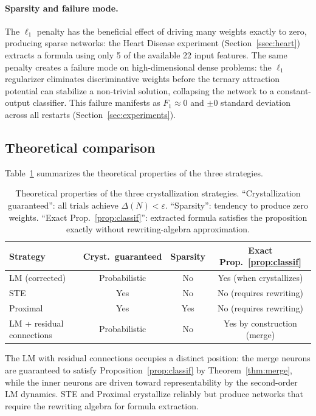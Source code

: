 \documentclass[12pt,a4paper]{article}
\begin{document}
\paragraph{Sparsity and failure mode.}
The $\ell_1$ penalty has the beneficial effect of driving many weights exactly
to zero, producing sparse networks: the Heart Disease experiment (Section~\ref{ssec:heart})
extracts a formula using only 5 of the available 22 input features.
The same penalty creates a failure mode on high-dimensional dense problems:
the $\ell_1$ regularizer eliminates discriminative weights before
the ternary attraction potential can stabilize a non-trivial solution,
collapsing the network to a constant-output classifier.
This failure manifests as $F_1 \approx 0$ and $\pm 0$ standard deviation across
all restarts (Section~\ref{sec:experiments}).

\subsection{Theoretical comparison}
\label{ssec:comparison}

Table~\ref{tab:theory} summarizes the theoretical properties of the three strategies.

\begin{table}[h]
\centering
\caption{Theoretical properties of the three crystallization strategies.
``Crystallization guaranteed'': all trials achieve $\Delta(N) < \varepsilon$.
``Sparsity'': tendency to produce zero weights.
``Exact Prop.~\ref{prop:classif}'': extracted formula satisfies the proposition
exactly without rewriting-algebra approximation.}
\label{tab:theory}
\setlength{\tabcolsep}{5pt}
\begin{tabular}{lccc}
\toprule
Strategy & Cryst.\ guaranteed & Sparsity & Exact Prop.~\ref{prop:classif} \\
\midrule
LM (corrected)            & Probabilistic & No  & Yes (when crystallizes) \\
STE                        & Yes           & No  & No (requires rewriting) \\
Proximal                   & Yes           & Yes & No (requires rewriting) \\
LM + residual connections  & Probabilistic & No  & Yes by construction (merge) \\
\bottomrule
\end{tabular}
\end{table}

The LM with residual connections occupies a distinct position: the merge
neurons are guaranteed to satisfy Proposition~\ref{prop:classif} by
Theorem~\ref{thm:merge}, while the inner neurons are driven toward
representability by the second-order LM dynamics.
STE and Proximal crystallize reliably but produce networks that require the
rewriting algebra for formula extraction.
\end{document}
